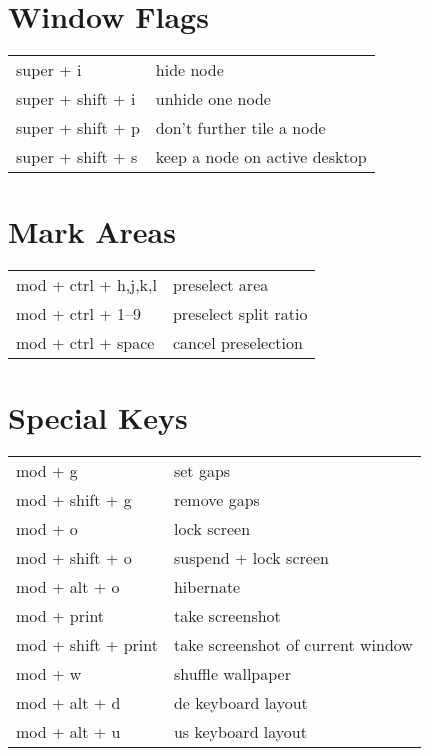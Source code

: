 \documentclass[
    10pt,
    a4paper,
    notitlepage,
]{scrartcl}
\begin{document}
\section{Window Flags}
\begin{tabular}{p{4cm}l}
    super + i           & hide node                         \\
    super + shift + i   & unhide one node                   \\
    super + shift + p   & don't further tile a node         \\
    super + shift + s   & keep a node on active desktop
\end{tabular}

\section{Mark Areas}
\begin{tabular}{p{4cm}l}
    mod + ctrl + h,j,k,l  & preselect area                    \\
    mod + ctrl + 1--9     & preselect split ratio             \\
    mod + ctrl + space    & cancel preselection
\end{tabular}

\section{Special Keys}
\begin{tabular}{p{4cm}l}
    mod + g             & set gaps                              \\
    mod + shift + g     & remove gaps                           \\
    mod + o             & lock screen                           \\
    mod + shift + o     & suspend + lock screen                 \\
    mod + alt + o       & hibernate                             \\
    mod + print         & take screenshot                       \\
    mod + shift + print & take screenshot of current window     \\
    mod + w             & shuffle wallpaper                     \\
    mod + alt + d       & de keyboard layout                    \\
    mod + alt + u       & us keyboard layout
\end{tabular}
\end{document}
